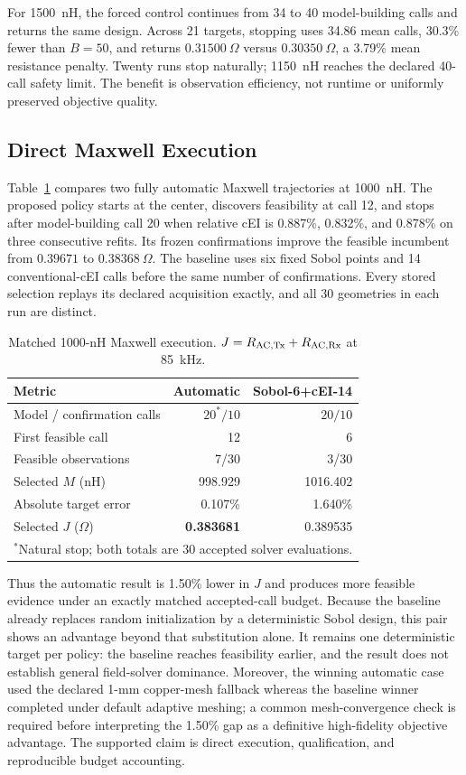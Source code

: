 \documentclass[conference]{IEEEtran}
\begin{document}
For 1500~nH, the forced control continues from 34 to 40 model-building calls and returns the same design. Across 21 targets, stopping uses 34.86 mean calls, 30.3\% fewer than $B=50$, and returns $0.31500~\Omega$ versus $0.30350~\Omega$, a 3.79\% mean resistance penalty. Twenty runs stop naturally; 1150~nH reaches the declared 40-call safety limit. The benefit is observation efficiency, not runtime or uniformly preserved objective quality.

\subsection{Direct Maxwell Execution}
Table~\ref{tab:maxwell} compares two fully automatic Maxwell trajectories at 1000~nH. The proposed policy starts at the center, discovers feasibility at call 12, and stops after model-building call 20 when relative cEI is 0.887\%, 0.832\%, and 0.878\% on three consecutive refits. Its frozen confirmations improve the feasible incumbent from $0.39671$ to $0.38368~\Omega$. The baseline uses six fixed Sobol points and 14 conventional-cEI calls before the same number of confirmations. Every stored selection replays its declared acquisition exactly, and all 30 geometries in each run are distinct.

\begin{table}[!h]
\caption{Matched 1000-nH Maxwell execution. $J=R_{\rm AC,Tx}+R_{\rm AC,Rx}$ at 85~kHz.}
\label{tab:maxwell}
\centering
\scriptsize
\begin{tabular}{@{}lrr@{}}
\toprule
Metric & Automatic & Sobol-6+cEI-14 \\
\midrule
Model / confirmation calls & $20^\ast/10$ & $20/10$ \\
First feasible call & 12 & 6 \\
Feasible observations & 7/30 & 3/30 \\
Selected $M$ (nH) & 998.929 & 1016.402 \\
Absolute target error & 0.107\% & 1.640\% \\
Selected $J$ ($\Omega$) & \textbf{0.383681} & 0.389535 \\
\bottomrule
\multicolumn{3}{l}{\footnotesize $^\ast$Natural stop; both totals are 30 accepted solver evaluations.}
\end{tabular}
\end{table}

Thus the automatic result is 1.50\% lower in $J$ and produces more feasible evidence under an exactly matched accepted-call budget. Because the baseline already replaces random initialization by a deterministic Sobol design, this pair shows an advantage beyond that substitution alone. It remains one deterministic target per policy: the baseline reaches feasibility earlier, and the result does not establish general field-solver dominance. Moreover, the winning automatic case used the declared 1-mm copper-mesh fallback whereas the baseline winner completed under default adaptive meshing; a common mesh-convergence check is required before interpreting the 1.50\% gap as a definitive high-fidelity objective advantage. The supported claim is direct execution, qualification, and reproducible budget accounting.
\end{document}
